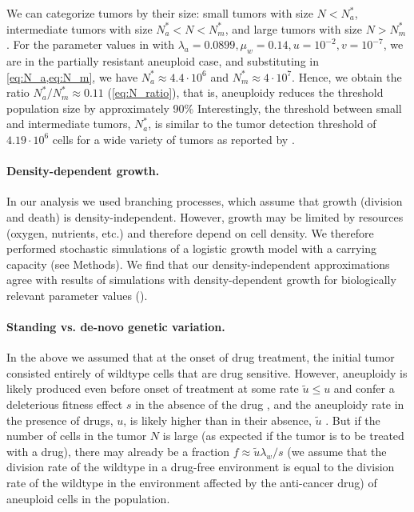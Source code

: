 \documentclass[12pt]{extarticle}
\begin{document}
We can categorize tumors by their size: small tumors with size $N<N_a^*$, intermediate tumors with size $N_a^*<N<N_m^*$, and large tumors with size $N>N_m^*$ .
For the parameter values in  with $\lambda_a=0.0899,\mu_w=0.14, u=10^{-2}, v=10^{-7}$, we are in the partially resistant aneuploid case, and substituting in \cref{eq:N_a,eq:N_m}, we have $N_a^* \approx 4.4 \cdot 10^6$ and $N_m^* \approx 4 \cdot 10^7$.
Hence, we obtain the ratio $N^*_a/N^*_m \approx 0.11$ (\cref{eq:N_ratio}), that is, aneuploidy reduces the threshold population size by approximately 90\% 
Interestingly, the threshold between small and intermediate tumors, $N_a^*$, is similar to the tumor detection threshold of $4.19 \cdot 10^6$ cells for a wide variety of tumors as reported by \citet{avanzini2019cancer}.

\paragraph*{Density-dependent growth.}

In our analysis we used branching processes, which assume that growth (division and death) is density-independent. However, growth may be limited by resources (oxygen, nutrients, etc.) and therefore depend on cell density. 
We therefore performed stochastic simulations of a logistic growth model with a carrying capacity (see Methods). 
We find that our density-independent approximations agree with results of simulations with density-dependent growth for biologically relevant parameter values ().

\paragraph*{Standing vs. de-novo genetic variation.}

In the above we assumed that at the onset of drug treatment, the initial tumor consisted entirely of wildtype cells that are drug sensitive.
However, aneuploidy is likely produced even before onset of treatment at some rate $\tilde{u} \le u$ and confer a deleterious fitness effect $s$ in the absence of the drug \citep{replogle2020aneuploidy,giam2015aneuploidy}, and the aneuploidy rate in the presence of drugs, $u$, is likely higher than in their absence, $\tilde{u}$ \citep{wang2019molecular,mason2017functional}.
But if the number of cells in the tumor $N$ is large (as expected if the tumor is to be treated with a drug), there may already be a fraction $f \approx \tilde{u}\lambda_w/s$ (we assume that the division rate of the wildtype in a drug-free environment is equal to the division rate of the wildtype in the environment affected by the anti-cancer drug) of aneuploid cells in the population.
\end{document}
